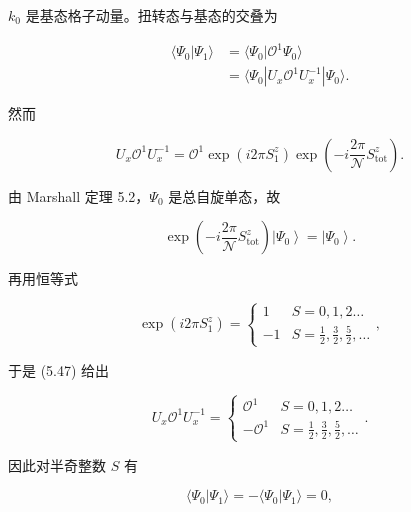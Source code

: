 $k_{0}$ 是基态格子动量。扭转态与基态的交叠为

\begin{align*}
\langle \Psi_ {0} | \Psi_ {1} \rangle & = \langle \Psi_ {0} | \mathcal {O} ^ {1} \Psi_ {0} \rangle\\
& = \langle \Psi_ {0} | U _ {x} \mathcal {O} ^ {1} U _ {x} ^ {- 1} | \Psi_ {0} \rangle .
\tag{5.46}
\end{align*}

然而

\begin{equation*}
U _ {x} \mathcal {O} ^ {1} U _ {x} ^ {- 1} = \mathcal {O} ^ {1} \exp ( i 2 \pi S _ {1} ^ {z} ) \exp \left( - i \frac {2 \pi}{\mathcal {N}} S _ {\mathrm{tot}} ^ {z} \right).
\tag{5.47}
\end{equation*}

由 Marshall 定理 5.2，$\Psi_0$ 是总自旋单态，故

\begin{equation*}
\exp \left( - i \frac {2 \pi}{\mathcal {N}} S _ {\mathrm{tot}} ^ {z} \right) \left| \Psi_ {0} \right\rangle = \left| \Psi_ {0} \right\rangle .
\tag{5.48}
\end{equation*}

再用恒等式

\begin{equation*}
\exp \left( i 2 \pi S _ {1} ^ {z} \right) = \left\{ \begin{array}{ll} 1 & S = 0, 1, 2 \ldots \\ - 1 & S = \frac {1}{2}, \frac {3}{2}, \frac {5}{2}, \ldots \end{array} \right. ,
\tag{5.49}
\end{equation*}

于是 (5.47) 给出

\begin{equation*}
U _ {x} \mathcal {O} ^ {1} U _ {x} ^ {- 1} = \left\{ \begin{array}{ll} \mathcal {O} ^ {1} & S = 0, 1, 2 \ldots \\ - \mathcal {O} ^ {1} & S = \frac {1}{2}, \frac {3}{2}, \frac {5}{2}, \ldots \end{array} \right. .
\tag{5.50}
\end{equation*}

因此对半奇整数 $S$ 有

\begin{equation*}
\langle \Psi_ {0} | \Psi_ {1} \rangle = - \langle \Psi_ {0} | \Psi_ {1} \rangle = 0 ,
\tag{5.51}
\end{equation*}

